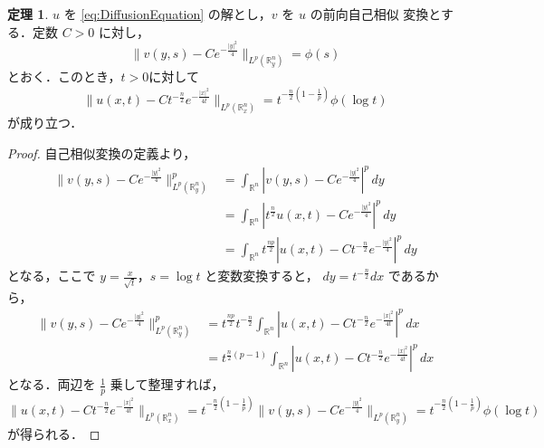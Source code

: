 \documentclass[paper=a4,
fontsize=12pt,
reqno,
uplatex,
dvipdfmx]{jlreq}
\theoremstyle{definition} %
\newtheorem{theorem}{定理}
\begin{document}
\begin{theorem}
 $u$ を \eqref{eq:DiffusionEquation} の解とし，$v$ を $u$ の前向自己相似
 変換とする．定数 $C > 0$ に対し，
 \begin{equation}
  \| 
   v(y, s)
   -
   C e^{-\frac{|y|^2}{4}}
   \|_{L^p(\mathbb{R}_y^n)}
   =
   \phi(s)
 \end{equation}
 とおく．このとき，$t>0$に対して
 \begin{equation}
  \| 
   u(x, t)
   -
   C t^{-\frac{n}{2}} e^{-\frac{|x|^2}{4t}}
   \|_{L^p(\mathbb{R}_x^n)}
   =
   t^{-\frac{n}{2}
   \left(1 - \frac{1}{p}
   \right)}
   \phi(\log t)
 \end{equation}
 が成り立つ．
\end{theorem}

\begin{proof}
 自己相似変換の定義より，
 \begin{align}
  \| 
  v(y, s)
  -
  C e^{-\frac{|y|^2}{4}}
  \|_{L^p(\mathbb{R}_y^n)}^p
  &=
  \int_{\mathbb{R}^n}
  \left|
  v(y, s)
  -
  C e^{-\frac{|y|^2}{4}}
  \right|^p
  \, dy \\
  &= 
  \int_{\mathbb{R}^n}
  \left| 
  t^{\frac{n}{2}} u(x, t) - C e^{-\frac{|y|^2}{4}}
  \right|^p
  \, dy \\
  &=
  \int_{\mathbb{R}^n} t^{\frac{np}{2}} 
  \left| 
  u(x, t)
  -
  C t^{-\frac{n}{2}} e^{-\frac{|y|^2}{4}}
  \right|^p
  \, dy
 \end{align}
 となる，ここで $y = \frac{x}{\sqrt{t}}$，$s = \log t$ と変数変換すると，
 $dy = t^{-\frac{n}{2}} dx$ であるから，
 \begin{align}
  \| 
  v(y, s)
  -
  C e^{-\frac{|y|^2}{4}} 
  \|_{L^p(\mathbb{R}_y^n)}^p 
  &=
  t^{\frac{np}{2}} 
  t^{-\frac{n}{2}}
  \int_{\mathbb{R}^n}
  \left|
  u(x, t) - C t^{-\frac{n}{2}} e^{-\frac{|x|^2}{4t}}
  \right|^p
  \, dx \\
  &=
  t^{\frac{n}{2}(p - 1)} 
  \int_{\mathbb{R}^n}
  \left| 
  u(x, t) - C t^{-\frac{n}{2}} e^{-\frac{|x|^2}{4t}}
  \right|^p
  \, dx
 \end{align}
 となる．両辺を $\frac{1}{p}$ 乗して整理すれば，
 \begin{equation}
  \|
   u(x, t) 
   -
   C t^{-\frac{n}{2}} e^{-\frac{|x|^2}{4t}}
   \|_{L^p(\mathbb{R}_x^n)}
   = 
   t^{-\frac{n}{2}\left(1 - \frac{1}{p}\right)} 
   \|
   v(y, s) - C e^{-\frac{|y|^2}{4}}
   \|_{L^p(\mathbb{R}_y^n)}
   = 
   t^{-\frac{n}{2}\left(1 - \frac{1}{p}\right)} \phi(\log t) 
 \end{equation}
 が得られる．
\end{proof}
\end{document}
